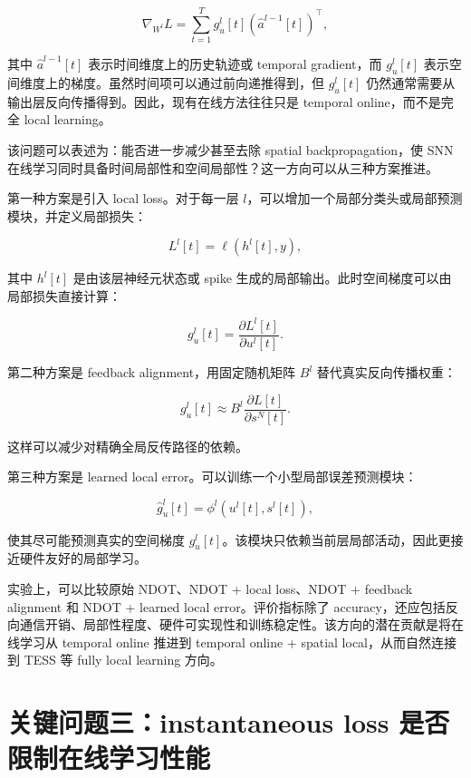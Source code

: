 \documentclass[11pt]{ctexart}
\begin{document}
\begin{equation}
\nabla_{W^l}L
=
\sum_{t=1}^{T}
 g_u^l[t]
\left(\hat a^{l-1}[t]\right)^\top ,
\end{equation}

其中 $\hat a^{l-1}[t]$ 表示时间维度上的历史轨迹或 temporal gradient，而 $g_u^l[t]$ 表示空间维度上的梯度。虽然时间项可以通过前向递推得到，但 $g_u^l[t]$ 仍然通常需要从输出层反向传播得到。因此，现有在线方法往往只是 temporal online，而不是完全 local learning。

该问题可以表述为：能否进一步减少甚至去除 spatial backpropagation，使 SNN 在线学习同时具备时间局部性和空间局部性？这一方向可以从三种方案推进。

第一种方案是引入 local loss。对于每一层 $l$，可以增加一个局部分类头或局部预测模块，并定义局部损失：

\begin{equation}
L^l[t] = \ell(h^l[t], y),
\end{equation}

其中 $h^l[t]$ 是由该层神经元状态或 spike 生成的局部输出。此时空间梯度可以由局部损失直接计算：

\begin{equation}
 g_u^l[t]
=
\frac{\partial L^l[t]}{\partial u^l[t]} .
\end{equation}

第二种方案是 feedback alignment，用固定随机矩阵 $B^l$ 替代真实反向传播权重：

\begin{equation}
 g_u^l[t]
\approx
B^l
\frac{\partial L[t]}{\partial s^N[t]} .
\end{equation}

这样可以减少对精确全局反传路径的依赖。

第三种方案是 learned local error。可以训练一个小型局部误差预测模块：

\begin{equation}
\hat g_u^l[t]
=
\phi^l(u^l[t],s^l[t]),
\end{equation}

使其尽可能预测真实的空间梯度 $g_u^l[t]$。该模块只依赖当前层局部活动，因此更接近硬件友好的局部学习。

实验上，可以比较原始 NDOT、NDOT + local loss、NDOT + feedback alignment 和 NDOT + learned local error。评价指标除了 accuracy，还应包括反向通信开销、局部性程度、硬件可实现性和训练稳定性。该方向的潜在贡献是将在线学习从 temporal online 推进到 temporal online + spatial local，从而自然连接到 TESS 等 fully local learning 方向。

\section{关键问题三：instantaneous loss 是否限制在线学习性能}
\end{document}
